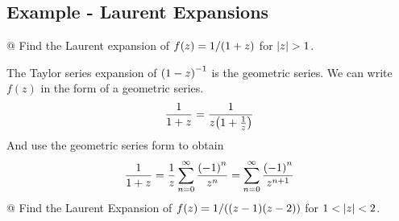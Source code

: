     \subsection{Example - Laurent Expansions}
    \begin{easylist}[itemize]
        @ Find the Laurent expansion of $f(z)=1/{\left( 1+z \right)}$ for $\left\lvert z \right\rvert>1$.

        The Taylor series expansion of ${\left( 1-z \right)}^{-1}$ is the geometric
        series. We can write $f(z)$ in the form of a geometric series.
        \begin{align*}
            \frac{1}{1+z} = \frac{1}{z{\left( 1 + \frac{1}{z} \right)}}
        \end{align*}
        And use the geometric series form to obtain
        \begin{align*}
            \frac{1}{1+z} = \frac{1}{z} \sum_{n=0}^\infty
            \frac{{\left( -1 \right)}^n}{z^n} =
            \sum_{n=0}^\infty\frac{{\left( -1 \right)}^n}{z^{n+1}} 
        \end{align*}
        @ Find the Laurent Expansion of $f(z) = 1 /
        {\left( {\left( z-1 \right)}{\left( z-2 \right)} \right)}$ for $1 < \left\lvert z \right\rvert < 2$.


\end{easylist}
